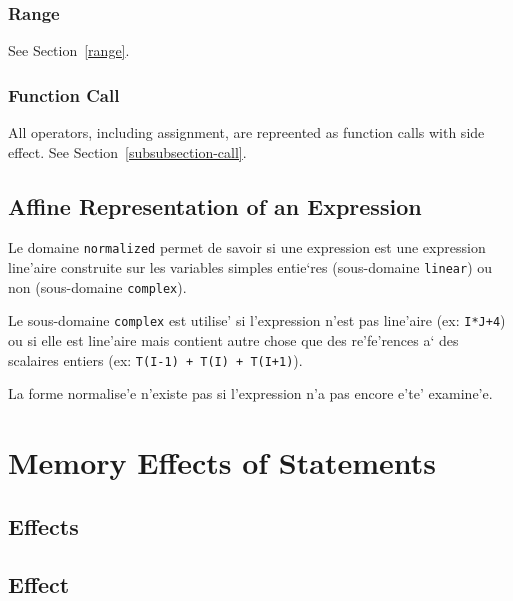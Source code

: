 \subsubsection{Range}

See Section~\ref{range}.

\subsubsection{Function Call}

All operators, including assignment, are repreented as function calls
with side effect. See Section~\ref{subsubsection-call}.

\subsection{Affine Representation of an Expression}
\label{subsection-normalized}

{ Le domaine {\tt normalized} permet de savoir si une expression est une
expression line'aire construite sur les variables simples entie`res
(sous-domaine {\tt linear}) ou non (sous-domaine {\tt complex}).

Le sous-domaine {\tt complex} est utilise' si l'expression n'est pas
line'aire (ex: {\tt I*J+4}) ou si elle est line'aire mais contient autre
chose que des re'fe'rences a` des scalaires entiers (ex: {\tt T(I-1) +
T(I) + T(I+1)}).

La forme normalise'e n'existe pas si l'expression n'a pas encore e'te'
examine'e. }

\section{Memory Effects of Statements}
\label{effects}

\subsection{Effects}
\label{subsection-effects}

{}

\subsection{Effect}
\label{subsection-effect}

